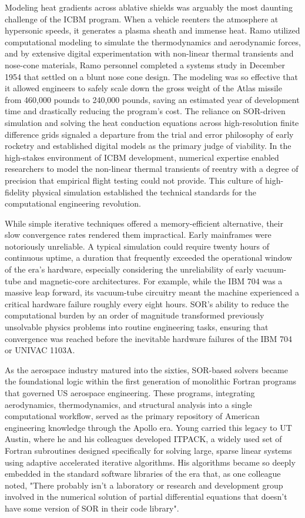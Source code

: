 Modeling heat gradients across ablative shields was arguably the most daunting challenge of the ICBM program. When a vehicle reenters the atmosphere at hypersonic speeds, it generates a plasma sheath and immense heat. Ramo utilized computational modeling to simulate the thermodynamics and aerodynamic forces, and by extensive digital experimentation with non-linear thermal transients and nose-cone materials, Ramo personnel completed a systems study in December 1954 that settled on a blunt nose cone design. The modeling was so effective that it allowed engineers to safely scale down the gross weight of the Atlas missile from 460,000 pounds to 240,000 pounds, saving an estimated year of development time and drastically reducing the program's cost. The reliance on SOR-driven simulation and solving the heat conduction equations across high-resolution finite difference grids signaled a departure from the trial and error philosophy of early rocketry and established digital models as the primary judge of viability. In the high-stakes environment of ICBM development, numerical expertise enabled researchers to model the non-linear thermal transients of reentry with a degree of precision that empirical flight testing could not provide. This culture of high-fidelity physical simulation established the technical standards for the computational engineering revolution.

While simple iterative techniques offered a memory-efficient alternative, their slow convergence rates rendered them impractical. Early mainframes were notoriously unreliable. A typical simulation could require twenty hours of continuous uptime, a duration that frequently exceeded the operational window of the era's hardware, especially considering the unreliability of early vacuum-tube and magnetic-core architectures. For example, while the IBM 704 was a massive leap forward, its vacuum-tube circuitry meant the machine experienced a critical hardware failure roughly every eight hours. SOR’s ability to reduce the computational burden by an order of magnitude transformed previously unsolvable physics problems into routine engineering tasks, ensuring that convergence was reached before the inevitable hardware failures of the IBM 704 or UNIVAC 1103A. 

As the aerospace industry matured into the sixties, SOR-based solvers became the foundational logic within the first generation of monolithic Fortran programs that governed US aerospace engineering. These programs, integrating aerodynamics, thermodynamics, and structural analysis into a single computational workflow, served as the primary repository of American engineering knowledge through the Apollo era. Young carried this legacy to UT Austin, where he and his colleagues developed ITPACK, a widely used set of Fortran subroutines designed specifically for solving large, sparse linear systems using adaptive accelerated iterative algorithms. His algorithms became so deeply embedded in the standard software libraries of the era that, as one colleague noted, "There probably isn't a laboratory or research and development group involved in the numerical solution of partial differential equations that doesn't have some version of SOR in their code library". 

